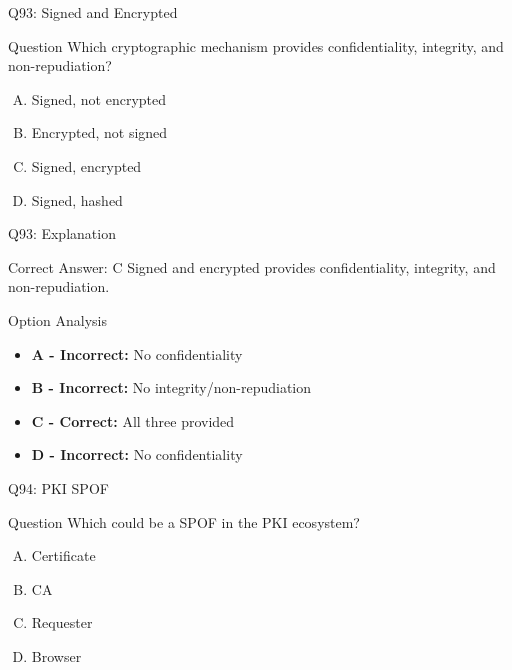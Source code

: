 \documentclass{beamer}
\begin{document}
	\begin{frame}{Q93: Signed and Encrypted}
		\begin{block}{Question}
			Which cryptographic mechanism provides confidentiality, integrity, and non-repudiation?
		\end{block}
		\begin{enumerate}[(A)]
			\item Signed, not encrypted
			\item Encrypted, not signed
			\item Signed, encrypted
			\item Signed, hashed
		\end{enumerate}
	\end{frame}
	
	\begin{frame}{Q93: Explanation}
		\begin{block}{Correct Answer: C}
			Signed and encrypted provides confidentiality, integrity, and non-repudiation.
		\end{block}
		\begin{block}{Option Analysis}
			\begin{itemize}
				\item \textbf{A - Incorrect:} No confidentiality
				\item \textbf{B - Incorrect:} No integrity/non-repudiation
				\item \textbf{C - Correct:} All three provided
				\item \textbf{D - Incorrect:} No confidentiality
			\end{itemize}
		\end{block}
	\end{frame}
	
	\begin{frame}{Q94: PKI SPOF}
		\begin{block}{Question}
			Which could be a SPOF in the PKI ecosystem?
		\end{block}
		\begin{enumerate}[(A)]
			\item Certificate
			\item CA
			\item Requester
			\item Browser
		\end{enumerate}
	\end{frame}
	
\end{document}
